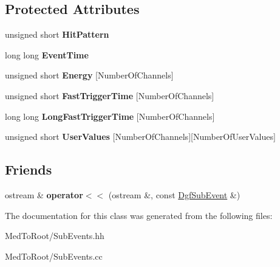 \subsection*{Protected Attributes}
\begin{DoxyCompactItemize}
\item 
\hypertarget{class_dgf_sub_event_af2f6acbebcc14dd9a790cf88a44a35a4}{unsigned short {\bfseries Hit\-Pattern}}\label{class_dgf_sub_event_af2f6acbebcc14dd9a790cf88a44a35a4}

\item 
\hypertarget{class_dgf_sub_event_aedcb285d2a8853ac8dd0de4983a82e18}{long long {\bfseries Event\-Time}}\label{class_dgf_sub_event_aedcb285d2a8853ac8dd0de4983a82e18}

\item 
\hypertarget{class_dgf_sub_event_a73fc042eb429ad9232811351cc0059c5}{unsigned short {\bfseries Energy} \mbox{[}Number\-Of\-Channels\mbox{]}}\label{class_dgf_sub_event_a73fc042eb429ad9232811351cc0059c5}

\item 
\hypertarget{class_dgf_sub_event_a55acb5f1b72f274f7201d33df90620e5}{unsigned short {\bfseries Fast\-Trigger\-Time} \mbox{[}Number\-Of\-Channels\mbox{]}}\label{class_dgf_sub_event_a55acb5f1b72f274f7201d33df90620e5}

\item 
\hypertarget{class_dgf_sub_event_a1a4328e7ef711bd75cd82a89b6fddad5}{long long {\bfseries Long\-Fast\-Trigger\-Time} \mbox{[}Number\-Of\-Channels\mbox{]}}\label{class_dgf_sub_event_a1a4328e7ef711bd75cd82a89b6fddad5}

\item 
\hypertarget{class_dgf_sub_event_aaa57b5de7ab6aedd46a9f1486d37719c}{unsigned short {\bfseries User\-Values} \mbox{[}Number\-Of\-Channels\mbox{]}\mbox{[}Number\-Of\-User\-Values\mbox{]}}\label{class_dgf_sub_event_aaa57b5de7ab6aedd46a9f1486d37719c}

\end{DoxyCompactItemize}
\subsection*{Friends}
\begin{DoxyCompactItemize}
\item 
\hypertarget{class_dgf_sub_event_a98fb82e2308f57cabcdf001424381c3e}{ostream \& {\bfseries operator$<$$<$} (ostream \&, const \hyperlink{class_dgf_sub_event}{Dgf\-Sub\-Event} \&)}\label{class_dgf_sub_event_a98fb82e2308f57cabcdf001424381c3e}

\end{DoxyCompactItemize}


The documentation for this class was generated from the following files\-:\begin{DoxyCompactItemize}
\item 
Med\-To\-Root/Sub\-Events.\-hh\item 
Med\-To\-Root/Sub\-Events.\-cc\end{DoxyCompactItemize}
